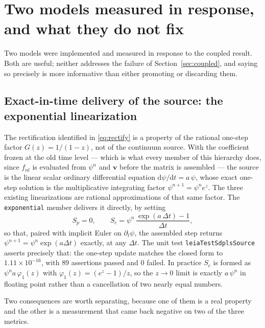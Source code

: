 \documentclass[preprint,3p,11pt]{elsarticle}
\newcommand{\psilev}{\psi}
\begin{document}
\section{Two models measured in response, and what they do not fix}
\label{sec:remedies}

Two models were implemented and measured in response to the coupled result. Both
are useful; neither addresses the failure of Section~\ref{sec:coupled}, and
saying so precisely is more informative than either promoting or discarding them.

\subsection{Exact-in-time delivery of the source: the exponential linearization}
\label{sec:exp}

The rectification identified in \eqref{eq:rectify} is a property of the rational
one-step factor $G(z) = 1/(1-z)$, not of the continuum source. With the
coefficient frozen at the old time level --- which is what every member of this
hierarchy does, since $f_{nl}$ is evaluated from $\psilev^n$ and $\mathbf{v}$
before the matrix is assembled --- the source is the linear scalar ordinary
differential equation $\mathrm d\psilev/\mathrm dt = a\,\psilev$, whose exact
one-step solution is the multiplicative integrating factor $\psilev^{n+1} =
\psilev^n e^{z}$. The three existing linearizations are rational approximations
of that same factor. The \texttt{exponential} member delivers it directly, by
setting
\begin{equation}
  S_p = 0, \qquad
  S_c = \psilev^n\,\frac{\exp(a\,\Delta t) - 1}{\Delta t},
  \label{eq:expsource}
\end{equation}
so that, paired with implicit Euler on $\partial_t\psilev$, the assembled step
returns $\psilev^{n+1} = \psilev^n \exp(a\Delta t)$ exactly, at any $\Delta t$.
The unit test \texttt{leiaTestSdplsSource} asserts precisely that: the one-step
update matches the closed form to $1.11\times10^{-16}$, with $89$ assertions
passed and $0$ failed. In practice $S_c$ is formed as
$\psilev^n a\,\varphi_1(z)$ with $\varphi_1(z) = (e^z-1)/z$, so the $z\to0$ limit
is exactly $a\,\psilev^n$ in floating point rather than a cancellation of two
nearly equal numbers.

Two consequences are worth separating, because one of them is a real property and
the other is a measurement that came back negative on two of the three metrics.
\end{document}
